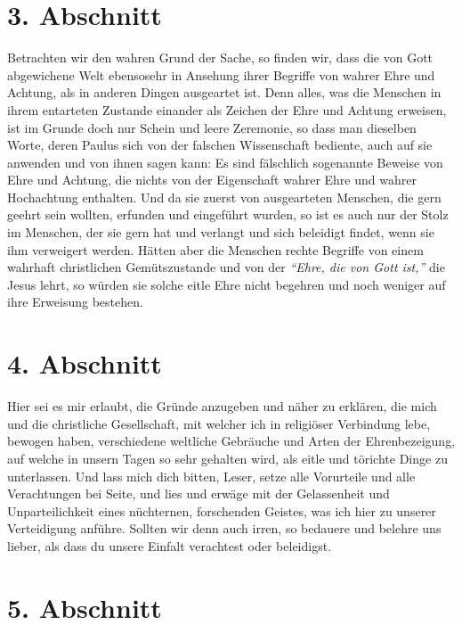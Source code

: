 \section{3. Abschnitt} \label{kap9_ab3}

Betrachten wir den wahren Grund der Sache, so finden wir, dass die von Gott
abgewichene Welt ebensosehr in Ansehung ihrer Begriffe von wahrer Ehre und
Achtung, als in anderen Dingen ausgeartet ist. Denn alles, was die Menschen in
ihrem entarteten Zustande einander als Zeichen der Ehre und Achtung erweisen,
ist im Grunde doch nur Schein und leere Zeremonie, so dass man dieselben Worte,
deren Paulus sich von der falschen
Wissenschaft bediente, auch auf sie
anwenden und von ihnen sagen kann: Es sind fälschlich sogenannte Beweise von
Ehre und Achtung, die nichts von der Eigenschaft wahrer Ehre und wahrer
Hochachtung enthalten. Und da sie zuerst von ausgearteten Menschen, die gern
geehrt sein wollten, erfunden und eingeführt wurden, so ist es auch nur der
Stolz im Menschen, der sie gern hat und verlangt und sich beleidigt findet,
wenn sie ihm verweigert werden. Hätten aber die Menschen rechte Begriffe von
einem wahrhaft christlichen Gemütszustande und von der
\textit{"`Ehre, die von Gott ist,"'}
die Jesus lehrt, so würden sie solche eitle
Ehre nicht begehren und noch weniger auf ihre Erweisung bestehen.

\section{4. Abschnitt} \label{kap9_ab4}

Hier sei es mir erlaubt, die Gründe anzugeben und näher zu erklären, die mich
und die christliche Gesellschaft, mit welcher ich in religiöser Verbindung lebe,
bewogen haben, verschiedene weltliche Gebräuche und Arten der Ehrenbezeigung,
auf welche in unsern Tagen so sehr gehalten wird, als eitle und törichte Dinge
zu unterlassen. Und lass mich dich bitten, Leser, setze alle Vorurteile und alle
Verachtungen bei Seite, und lies und erwäge mit der Gelassenheit und
Unparteilichkeit eines nüchternen, forschenden Geistes, was ich hier zu unserer
Verteidigung anführe. Sollten wir denn auch irren, so bedauere und belehre uns
lieber, als dass du unsere Einfalt verachtest oder beleidigst.

\section{5. Abschnitt} \label{kap9_ab5}


